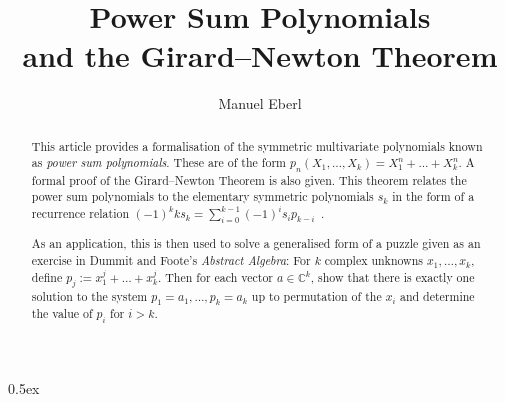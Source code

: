 \documentclass[11pt,a4paper]{article}
\begin{document}
\title{Power Sum Polynomials\\ and the Girard--Newton Theorem}
\author{Manuel Eberl}
\maketitle

\begin{abstract}
This article provides a formalisation of the symmetric multivariate polynomials known as \emph{power sum polynomials}. These are of the form $p_n(X_1,\ldots, X_k) = X_1 ^ n + \ldots + X_k ^ n$. A formal proof of the Girard--Newton Theorem is also given. This theorem relates the power sum polynomials to the elementary symmetric polynomials $s_k$ in the form of a recurrence relation $(-1)^k k s_k = \sum_{i=0}^{k-1} (-1)^i s_i p_{k-i}$\ .

As an application, this is then used to solve a generalised form of a puzzle given as an exercise in Dummit and Foote's \emph{Abstract Algebra}: For $k$ complex unknowns $x_1, \ldots, x_k$, define $p_j := x_1^j + \ldots + x_k^j$. Then for each vector $a\in\mathbb{C}^k$, show that there is exactly one solution to the system $p_1 = a_1, \ldots, p_k = a_k$ up to permutation of the $x_i$ and determine the value of $p_i$ for $i>k$.
\end{abstract}

\tableofcontents
\newpage
\parindent 0pt\parskip 0.5ex





\end{document}
